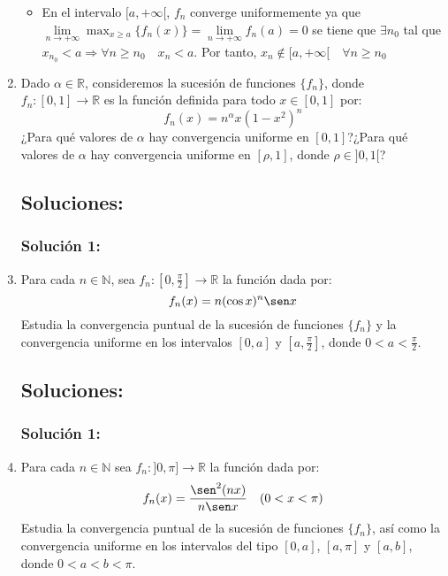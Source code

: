 \documentclass[a4paper, 11pt]{article} %
\begin{document}
\begin{enumerate}
\begin{itemize}
  			\item En el intervalo $[a,+\infty[$, $f_n$ converge uniformemente ya que \\
  			$\displaystyle{\lim\limits_{n \rightarrow +\infty} \max_{x \geq a}\{f_n(x)\}
  			= \lim\limits_{n \rightarrow +\infty} f_n(a)} = 0$ se tiene que $\exists
  			n_0$ tal que $x_{n_0} < a \Rightarrow \forall n \geq n_0 \quad x_n < a$.
  			Por tanto, $x_n \notin [a,+\infty[ \quad \forall n \geq n_0$
  		\end{itemize}
  		
	\item Dado $\alpha \in \mathbb{R}$, consideremos la sucesión de funciones $\{f_n\}$, donde\\ %
	$f_n: [0,1] \rightarrow \mathbb{R}$ es la función definida para todo $x \in [0,1]$ por:
	$$f_n(x) = n^\alpha x(1-x^2)^n$$
	¿Para qué valores de $\alpha$ hay convergencia uniforme en $[0,1]$?¿Para qué valores de
	$\alpha$ hay convergencia uniforme en $[\rho,1]$, donde $\rho \in ]0,1[$?
	\subsection*{Soluciones:}
		\subsubsection*{Solución 1:}
			
	\item Para cada $n \in \mathbb{N}$, sea $f_n: \left[0, \frac{\pi}{2}\right] \rightarrow \mathbb{R}$
	la función dada por:
	$$f_n(x) = n(\cos x)^n \sen x$$
	Estudia la convergencia puntual de la sucesión de funciones $\{f_n\}$ y la convergencia
	uniforme en los intervalos $[0, a]$ y $\left[a,\frac{\pi}{2}\right]$, donde $0 < a < \frac{\pi}{2}$.
	\subsection*{Soluciones:}
		\subsubsection*{Solución 1:}
	
	\item Para cada $n \in \mathbb{N}$ sea $f_n: ]0, \pi] \rightarrow \mathbb{R}$ la función dada por:
	$$f_n(x) = \frac{\sen^2(nx)}{n\sen x} \quad (0 < x < \pi)$$
	Estudia la convergencia puntual de la sucesión de funciones $\{f_n\}$, así como la convergencia
	uniforme en los intervalos del tipo $[0, a]$, $[a,\pi]$ y $[a,b]$, donde $0 < a < b < \pi$.

\end{enumerate}
\end{document}
